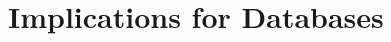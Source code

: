 \begin{comment}
http://docs.oracle.com/javaee/6/api/javax/persistence/UniqueConstraint.html

BEAN supported
https://jcp.org/en/jsr/detail?id=303

supports udf validations
http://book.cakephp.org/2.0/en/models/data-validation.html

basically you set up your own schema, but default validations don't
appear to be transactional




https://github.com/cakephp/cakephp/blob/50b3893e6507979427e1aaeb435494aed1af4f52/lib/Cake/Model/Model.php#L3303



Manually define database schema!


http://laravel.com/docs/4.2/validation#rule-unique
https://github.com/laravel/framework/blob/75b1dff27778354e44511556171cf6ae466c8b59/src/Illuminate/Validation/Validator.php#L940


http://laravelbook.com/laravel-input-validation/


Validations are handled by Anchor, a thin layer on top of Validator, one of the most robust validation libraries for Node.js. Sails supports most of the validations available in Validator, as well as a few extras that require database integration, like unique.

http://sailsjs.org/#/documentation/concepts/ORM/Validations.html
https://github.com/balderdashy/sails/issues/832

https://github.com/balderdashy/waterline

Broken in Mongo
https://github.com/balderdashy/sails-mongo/issues/152

Broken in dev
https://github.com/balderdashy/waterline/issues/55

Because you have migrate: safe set the indexes will not be created when you start the ORM.
https://github.com/balderdashy/waterline/issues/236

uses db foreign keys

\end{comment}



\section{Implications for Databases}
\label{sec:discussion}

